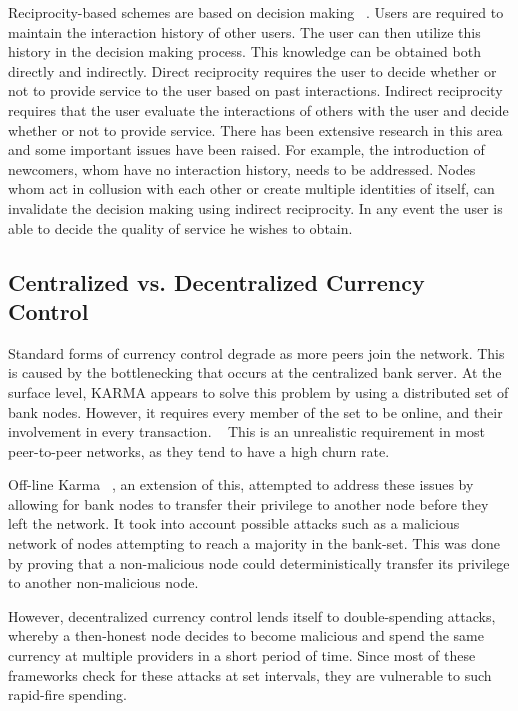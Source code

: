 \documentclass[%
				10pt,
        final,
        notitlepage,
        narroweqnarray,
        inline,
        twoside,
        ]{ieee}
\begin{document}
Reciprocity-based schemes are based on decision making ~\cite{feldman}.  Users are required to maintain the interaction history of other users.  The user can then utilize this history in the decision making process.  This knowledge can be obtained both directly and indirectly.  Direct reciprocity requires the user to decide whether or not to provide service to the user based on past interactions.  Indirect reciprocity requires that the user evaluate the interactions of others with  the user and decide whether or not to provide service.  There has been extensive research in this area and some important issues have been raised.  For example, the introduction of newcomers, whom have no interaction history, needs to be addressed.  Nodes whom act in collusion with each other or create multiple identities of itself, can invalidate the decision making using indirect reciprocity.  In any event the user is able to decide the quality of service he wishes to obtain.

\subsection{Centralized vs. Decentralized Currency Control}
Standard forms of currency control degrade as more peers join the network.  This is caused by the bottlenecking that occurs at the centralized bank server.  At the surface level, KARMA appears to solve this problem by using a distributed set of bank nodes.  However, it requires every member of the set to be online, and their involvement in every transaction. ~\cite{vishnumurthy}  This is an unrealistic requirement in most peer-to-peer networks, as they tend to have a high churn rate.

Off-line Karma ~\cite{garcia}, an extension of this, attempted to address these issues by allowing for bank nodes to transfer their privilege to another node before they left the network.  It took into account possible attacks such as a malicious network of nodes attempting to reach a majority in the bank-set.  This was done by proving that a non-malicious node could deterministically transfer its privilege to another non-malicious node.

However, decentralized currency control lends itself to double-spending attacks, whereby a then-honest node decides to become malicious and spend the same currency at multiple providers in a short period of time.  Since most of these frameworks check for these attacks at set intervals, they are vulnerable to such rapid-fire spending.  
\end{document}
